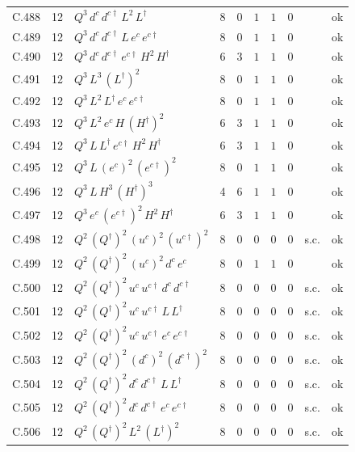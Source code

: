 {\begin{longtable}{@{}ll>{\raggedright\arraybackslash}p{6.4cm}rrllllr@{}}
C.488 & 12 & $Q^{3}\,d^c\,d^{c\dagger}\,L^{2}\,L^\dagger$ & 8 & 0 & $1$ & $1$ & $0$ &  & ok \\
C.489 & 12 & $Q^{3}\,d^c\,d^{c\dagger}\,L\,e^c\,e^{c\dagger}$ & 8 & 0 & $1$ & $1$ & $0$ &  & ok \\
C.490 & 12 & $Q^{3}\,d^c\,d^{c\dagger}\,e^{c\dagger}\,H^{2}\,H^\dagger$ & 6 & 3 & $1$ & $1$ & $0$ &  & ok \\
C.491 & 12 & $Q^{3}\,L^{3}\,(L^\dagger)^{2}$ & 8 & 0 & $1$ & $1$ & $0$ &  & ok \\
C.492 & 12 & $Q^{3}\,L^{2}\,L^\dagger\,e^c\,e^{c\dagger}$ & 8 & 0 & $1$ & $1$ & $0$ &  & ok \\
C.493 & 12 & $Q^{3}\,L^{2}\,e^c\,H\,(H^\dagger)^{2}$ & 6 & 3 & $1$ & $1$ & $0$ &  & ok \\
C.494 & 12 & $Q^{3}\,L\,L^\dagger\,e^{c\dagger}\,H^{2}\,H^\dagger$ & 6 & 3 & $1$ & $1$ & $0$ &  & ok \\
C.495 & 12 & $Q^{3}\,L\,(e^c)^{2}\,(e^{c\dagger})^{2}$ & 8 & 0 & $1$ & $1$ & $0$ &  & ok \\
C.496 & 12 & $Q^{3}\,L\,H^{3}\,(H^\dagger)^{3}$ & 4 & 6 & $1$ & $1$ & $0$ &  & ok \\
C.497 & 12 & $Q^{3}\,e^c\,(e^{c\dagger})^{2}\,H^{2}\,H^\dagger$ & 6 & 3 & $1$ & $1$ & $0$ &  & ok \\
C.498 & 12 & $Q^{2}\,(Q^\dagger)^{2}\,(u^c)^{2}\,(u^{c\dagger})^{2}$ & 8 & 0 & $0$ & $0$ & $0$ & s.c. & ok \\
C.499 & 12 & $Q^{2}\,(Q^\dagger)^{2}\,(u^c)^{2}\,d^c\,e^c$ & 8 & 0 & $1$ & $1$ & $0$ &  & ok \\
C.500 & 12 & $Q^{2}\,(Q^\dagger)^{2}\,u^c\,u^{c\dagger}\,d^c\,d^{c\dagger}$ & 8 & 0 & $0$ & $0$ & $0$ & s.c. & ok \\
C.501 & 12 & $Q^{2}\,(Q^\dagger)^{2}\,u^c\,u^{c\dagger}\,L\,L^\dagger$ & 8 & 0 & $0$ & $0$ & $0$ & s.c. & ok \\
C.502 & 12 & $Q^{2}\,(Q^\dagger)^{2}\,u^c\,u^{c\dagger}\,e^c\,e^{c\dagger}$ & 8 & 0 & $0$ & $0$ & $0$ & s.c. & ok \\
C.503 & 12 & $Q^{2}\,(Q^\dagger)^{2}\,(d^c)^{2}\,(d^{c\dagger})^{2}$ & 8 & 0 & $0$ & $0$ & $0$ & s.c. & ok \\
C.504 & 12 & $Q^{2}\,(Q^\dagger)^{2}\,d^c\,d^{c\dagger}\,L\,L^\dagger$ & 8 & 0 & $0$ & $0$ & $0$ & s.c. & ok \\
C.505 & 12 & $Q^{2}\,(Q^\dagger)^{2}\,d^c\,d^{c\dagger}\,e^c\,e^{c\dagger}$ & 8 & 0 & $0$ & $0$ & $0$ & s.c. & ok \\
C.506 & 12 & $Q^{2}\,(Q^\dagger)^{2}\,L^{2}\,(L^\dagger)^{2}$ & 8 & 0 & $0$ & $0$ & $0$ & s.c. & ok \\

\end{longtable}}
